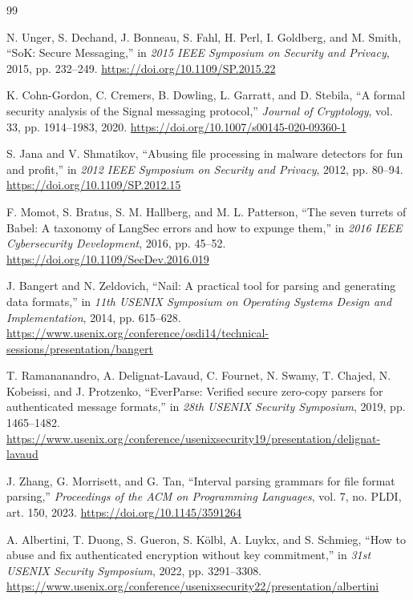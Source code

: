 \documentclass[preprint,12pt]{elsarticle}
\begin{document}
\begin{thebibliography}{99}

N. Unger, S. Dechand, J. Bonneau, S. Fahl, H. Perl, I. Goldberg, and
M. Smith, ``SoK: Secure Messaging,'' in \emph{2015 IEEE Symposium on
Security and Privacy}, 2015, pp. 232--249.
\url{https://doi.org/10.1109/SP.2015.22}

K. Cohn-Gordon, C. Cremers, B. Dowling, L. Garratt, and D. Stebila,
``A formal security analysis of the Signal messaging protocol,''
\emph{Journal of Cryptology}, vol. 33, pp. 1914--1983, 2020.
\url{https://doi.org/10.1007/s00145-020-09360-1}

S. Jana and V. Shmatikov, ``Abusing file processing in malware detectors
for fun and profit,'' in \emph{2012 IEEE Symposium on Security and Privacy},
2012, pp. 80--94. \url{https://doi.org/10.1109/SP.2012.15}

F. Momot, S. Bratus, S. M. Hallberg, and M. L. Patterson, ``The seven
turrets of Babel: A taxonomy of LangSec errors and how to expunge them,''
in \emph{2016 IEEE Cybersecurity Development}, 2016, pp. 45--52.
\url{https://doi.org/10.1109/SecDev.2016.019}

J. Bangert and N. Zeldovich, ``Nail: A practical tool for parsing and
generating data formats,'' in \emph{11th USENIX Symposium on Operating
Systems Design and Implementation}, 2014, pp. 615--628.
\url{https://www.usenix.org/conference/osdi14/technical-sessions/presentation/bangert}

T. Ramananandro, A. Delignat-Lavaud, C. Fournet, N. Swamy, T. Chajed,
N. Kobeissi, and J. Protzenko, ``EverParse: Verified secure zero-copy
parsers for authenticated message formats,'' in \emph{28th USENIX Security
Symposium}, 2019, pp. 1465--1482.
\url{https://www.usenix.org/conference/usenixsecurity19/presentation/delignat-lavaud}

J. Zhang, G. Morrisett, and G. Tan, ``Interval parsing grammars for file
format parsing,'' \emph{Proceedings of the ACM on Programming Languages},
vol. 7, no. PLDI, art. 150, 2023.
\url{https://doi.org/10.1145/3591264}

A. Albertini, T. Duong, S. Gueron, S. K{\"o}lbl, A. Luykx, and S. Schmieg,
``How to abuse and fix authenticated encryption without key commitment,''
in \emph{31st USENIX Security Symposium}, 2022, pp. 3291--3308.
\url{https://www.usenix.org/conference/usenixsecurity22/presentation/albertini}


\end{thebibliography}
\end{document}
